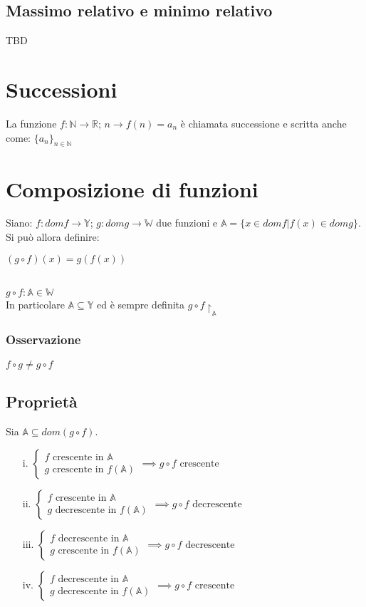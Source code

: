 \subsection{Massimo relativo e minimo relativo}
TBD
\section{Successioni}
La funzione $f: \mathbb{N} \rightarrow \mathbb{R}$;  $n \rightarrow f(n) = a_n$ è chiamata successione e scritta anche come: $\{a_n\}_{n \in \mathbb{N}}$

\section{Composizione di funzioni}
Siano: $f: domf \rightarrow \mathbb{Y}$; $g: domg \rightarrow \mathbb{W}$ due funzioni e $\mathbb{A}=\{x \in domf | f(x) \in domg\}$. Si può allora definire:\\
\begin{Large}
$(g \circ f)(x) = g(f(x))$
\end{Large}\\
$g \circ f: \mathbb{A} \in \mathbb{W}$\\
In particolare $\mathbb{A} \subseteq \mathbb{Y}$ ed è sempre definita $g \circ f \restriction _\mathbb{A}$
\subsubsection{Osservazione}
$f \circ g \neq g \circ f$


\subsection{Proprietà}
Sia $\mathbb{A} \subseteq dom(g \circ f)$.
\begin{enumerate}
\item[i.] $\begin{cases}
f \text{ crescente in } \mathbb{A}\\
g \text{ crescente in } f(\mathbb{A})
\end{cases} \implies g \circ f \text{ crescente}$
\item[ii.] $\begin{cases}
f \text{ crescente in } \mathbb{A}\\
g \text{ decrescente in } f(\mathbb{A})
\end{cases} \implies g \circ f \text{ decrescente}$
\item[iii.] $\begin{cases}
f \text{ decrescente in } \mathbb{A}\\
g \text{ crescente in } f(\mathbb{A})
\end{cases} \implies g \circ f \text{ decrescente}$
\item[iv.] $\begin{cases}
f \text{ decrescente in } \mathbb{A}\\
g \text{ decrescente in } f(\mathbb{A})
\end{cases} \implies g \circ f \text{ crescente}$
\end{enumerate} 

